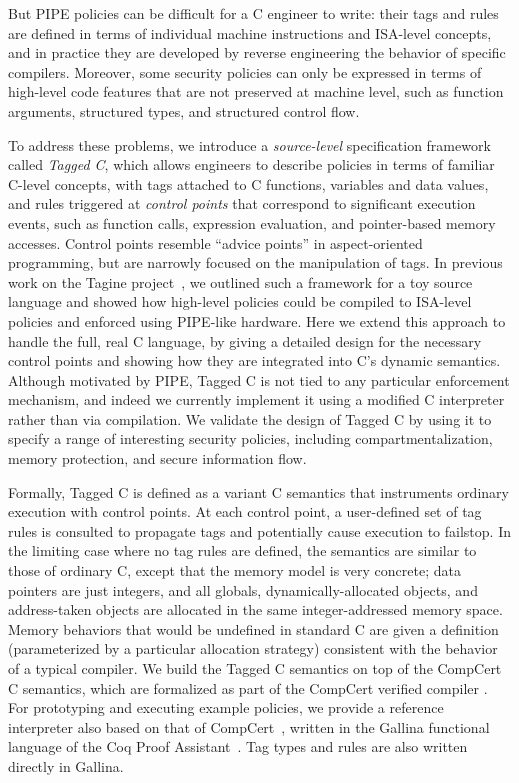 \documentclass{llncs}
\begin{document}
But PIPE policies can be difficult for a C engineer to write: their tags and rules
are defined in terms of individual machine instructions and ISA-level
concepts, and in practice they are developed by reverse engineering the behavior
of specific compilers. 
Moreover, some security policies can only be expressed in terms of high-level code
features that are not preserved at machine level, such as function
arguments, structured types, and structured control flow.

To address these problems, we introduce a \emph{source-level} specification framework called \emph{Tagged C},
which allows engineers to describe policies in terms of familiar C-level concepts, with tags attached to
C functions, variables and data values, and rules triggered at \emph{control points} that correspond to
significant execution events, such as function calls, expression evaluation, and pointer-based memory accesses. 
Control points resemble ``advice points'' in aspect-oriented programming, but are narrowly
focused on the manipulation of tags.
In previous work on the Tagine project~\cite{Chhak21:Tagine}, we outlined such a framework for a toy
source language and showed how high-level policies could be compiled to ISA-level policies and 
enforced using PIPE-like hardware.  Here we extend this approach to handle
the full, real C language, by giving a detailed design for the necessary control points and
showing how they are integrated into C's dynamic semantics. 
Although motivated by PIPE, Tagged C is not tied to any particular enforcement mechanism,
and indeed we currently implement it using a modified C interpreter rather than via compilation.
We validate the design of Tagged C by using it to specify a range of interesting security policies,
including compartmentalization, memory protection, and secure information flow.


Formally, Tagged C is defined as a variant C semantics that instruments ordinary execution with control points.
At each control point, a user-defined set of tag rules is consulted to propagate tags and potentially cause
execution to failstop. In the limiting case where no tag rules are defined, the semantics are similar to
those of ordinary C, except that the memory model is very concrete; 
data pointers are just integers, and all globals, dynamically-allocated objects,
and address-taken objects are allocated in the same integer-addressed memory space. Memory behaviors
that would be undefined in standard C are given a definition (parameterized by a particular allocation strategy)
consistent with the behavior of a typical compiler.
We build the Tagged C semantics on top of the CompCert C semantics, which are formalized 
as part of the CompCert verified compiler \cite{Leroy09:CompCert}. For prototyping and executing example policies,
we provide a reference interpreter also based on that of CompCert~\cite[Ch. 4]{Leroy22:CompCertManual},
written in the Gallina functional language of the Coq Proof Assistant~\cite{coq}.
Tag types and rules are also written directly in Gallina. 
\end{document}
